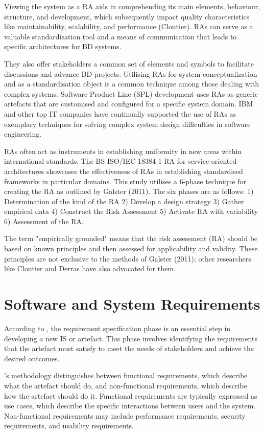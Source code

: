 \documentclass[preprint,12pt]{elsarticle}
\begin{document}
Viewing the system as a RA aids in comprehending its main elements, behaviour, structure, and development, which subsequently impact quality characteristics like maintainability, scalability, and performance (Cloutier). RAs can serve as a valuable standardisation tool and a means of communication that leads to specific architectures for BD systems. 

They also offer stakeholders a common set of elements and symbols to facilitate discussions and advance BD projects. Utilising RAs for system conceptualization and as a standardisation object is a common technique among those dealing with complex systems. Software Product Line (SPL) development uses RAs as generic artefacts that are customised and configured for a specific system domain. IBM and other top IT companies have continually supported the use of RAs as exemplary techniques for solving complex system design difficulties in software engineering. 

RAs often act as instruments in establishing uniformity in new areas within international standards. The BS ISO/IEC 18384-1 RA for service-oriented architectures showcases the effectiveness of RAs in establishing standardised frameworks in particular domains. This study utilises a 6-phase technique for creating the RA as outlined by Galster (2011). The six phases are as follows: 1) Determination of the kind of the RA 2) Develop a design strategy 3) Gather empirical data 4) Construct the Risk Assessment 5) Activate RA with variability 6) Assessment of the RA. 

The term "empirically grounded" means that the risk assessment (RA) should be based on known principles and then assessed for applicability and validity. These principles are not exclusive to the methods of Galster (2011); other researchers like Cloutier and Derras have also advocated for them.


\section{Software and System Requirements}
\label{sec:software_and_system_requirements}

According to \citeauthor{wieringa2014design}\cite{wieringa2014design}, the requirement specification phase is an essential step in developing a new IS or artefact. This phase involves identifying the requirements that the artefact must satisfy to meet the needs of stakeholders and achieve the desired outcomes.

\citeauthor{wieringa2014design}'s methodology distinguishes between functional requirements, which describe what the artefact should do, and non-functional requirements, which describe how the artefact should do it. Functional requirements are typically expressed as use cases, which describe the specific interactions between users and the system. Non-functional requirements may include performance requirements, security requirements, and usability requirements.
\end{document}
